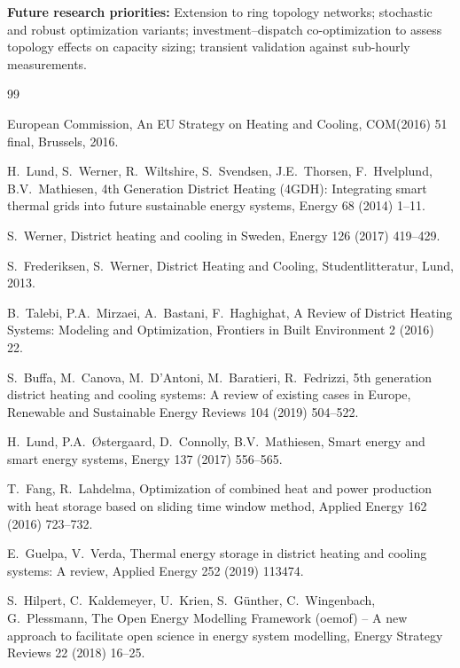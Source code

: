 \documentclass[review,3p]{elsarticle}
\begin{document}
\textbf{Future research priorities:} Extension to ring topology
networks; stochastic and robust optimization variants; investment--dispatch
co-optimization to assess topology effects on capacity sizing; transient
validation against sub-hourly measurements.


\begin{thebibliography}{99}

European Commission, An EU Strategy on Heating and Cooling,
COM(2016) 51 final, Brussels, 2016.

H.\ Lund, S.\ Werner, R.\ Wiltshire, S.\ Svendsen, J.E.\ Thorsen,
F.\ Hvelplund, B.V.\ Mathiesen,
4th Generation District Heating (4GDH): Integrating smart thermal
grids into future sustainable energy systems,
Energy 68 (2014) 1--11.

S.\ Werner,
District heating and cooling in Sweden,
Energy 126 (2017) 419--429.

S.\ Frederiksen, S.\ Werner,
District Heating and Cooling, Studentlitteratur, Lund, 2013.

B.\ Talebi, P.A.\ Mirzaei, A.\ Bastani, F.\ Haghighat,
A Review of District Heating Systems: Modeling and Optimization,
Frontiers in Built Environment 2 (2016) 22.

S.\ Buffa, M.\ Canova, M.\ D'Antoni, M.\ Baratieri, R.\ Fedrizzi,
5th generation district heating and cooling systems: A review of
existing cases in Europe,
Renewable and Sustainable Energy Reviews 104 (2019) 504--522.

H.\ Lund, P.A.\ Østergaard, D.\ Connolly, B.V.\ Mathiesen,
Smart energy and smart energy systems,
Energy 137 (2017) 556--565.

T.\ Fang, R.\ Lahdelma,
Optimization of combined heat and power production with heat storage
based on sliding time window method,
Applied Energy 162 (2016) 723--732.

E.\ Guelpa, V.\ Verda,
Thermal energy storage in district heating and cooling systems:
A review,
Applied Energy 252 (2019) 113474.

S.\ Hilpert, C.\ Kaldemeyer, U.\ Krien, S.\ Günther,
C.\ Wingenbach, G.\ Plessmann,
The Open Energy Modelling Framework (oemof) -- A new approach to
facilitate open science in energy system modelling,
Energy Strategy Reviews 22 (2018) 16--25.


\end{thebibliography}
\end{document}
